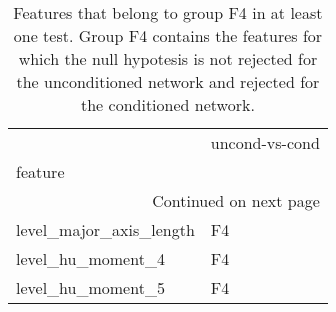 \documentclass{report}
\begin{document}
\begin{longtable}{ll}
	\caption[Features belonging to the F4 group]{ \small Features that belong to group F4 in at least one test. Group F4 contains the features for which the null hypotesis is not rejected for the unconditioned network and rejected for the conditioned network.}\\
	\toprule
	{} & uncond-vs-cond \\
	feature                 &                \\
	\midrule
	\endhead
	\midrule
	\multicolumn{2}{r}{{Continued on next page}} \\
	\midrule
	\endfoot
	
	\bottomrule
	\endlastfoot
	level\_major\_axis\_length &             F4 \\
	level\_hu\_moment\_4       &             F4 \\
	level\_hu\_moment\_5       &             F4 \\
\end{longtable}
\end{document}

